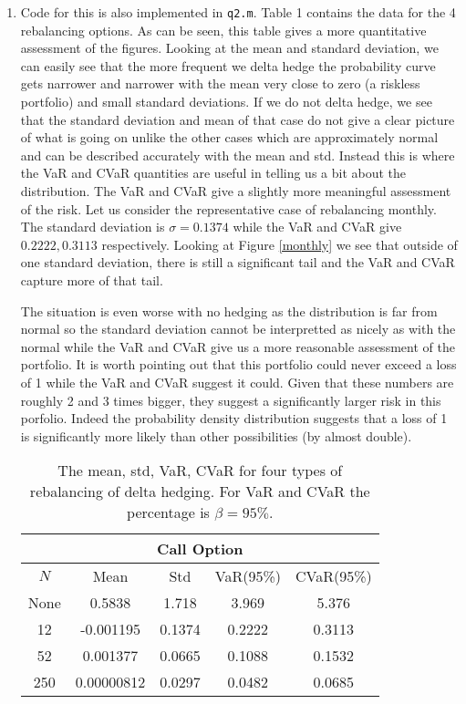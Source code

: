 \documentclass[10pt,english]{article}
\theoremstyle{plain}
\begin{document}
\begin{enumerate}
\begin{enumerate}
\item Code for this is also implemented in \texttt{q2.m}. Table 1 contains the data for the 4 rebalancing options. As can be seen, this table gives a more quantitative assessment of the figures. Looking at the mean and standard deviation, we can easily see that the more frequent we delta hedge the probability curve gets narrower and narrower with the mean very close to zero (a riskless portfolio) and small standard deviations. If we do not delta hedge, we see that the standard deviation and mean of that case do not give a clear picture of what is going on unlike the other cases which are approximately normal and can be described accurately with the mean and std. Instead this is where the VaR and CVaR quantities are useful in telling us a bit about the distribution. The VaR and CVaR give a slightly more meaningful assessment of the risk. Let us consider the representative case of rebalancing monthly. The standard deviation is $\sigma=0.1374$ while the VaR and CVaR give $0.2222,0.3113$ respectively. Looking at Figure \ref{monthly} we see that outside of one standard deviation, there is still a significant tail and the VaR and CVaR capture more of that tail.

The situation is even worse with no hedging as the distribution is far from normal so the standard deviation cannot be interpretted as nicely as with the normal while the VaR and CVaR give us a more reasonable assessment of the portfolio. It is worth pointing out that this portfolio could never exceed a loss of 1 while the VaR and CVaR suggest it could. Given that these numbers are roughly 2 and 3 times bigger, they suggest a significantly larger risk in this porfolio. Indeed the probability density distribution suggests that a loss of 1 is significantly more likely than other possibilities (by almost double).
\begin{table}[t]

\centering
\begin{tabular}{|c|c|c|c|c|}
\multicolumn{5}{c}{Call Option}\\
\hline
	$N$ & Mean & Std & VaR(95\%) & CVaR(95\%)  \\
\hline
	None & 0.5838 & 1.718 & 3.969 & 5.376 \\
	12	&	-0.001195 & 0.1374 & 0.2222 & 0.3113 \\
	52	&	 0.001377 & 0.0665 & 0.1088 & 0.1532 \\
	250	&		0.00000812 & 0.0297 & 0.0482 & 0.0685\\
\hline
\end{tabular}
\caption{The mean, std, VaR, CVaR for four types of rebalancing of delta hedging. For VaR and CVaR the percentage is $\beta=95\%$.}
\end{table}
\end{enumerate}


\end{enumerate}
\end{document}
